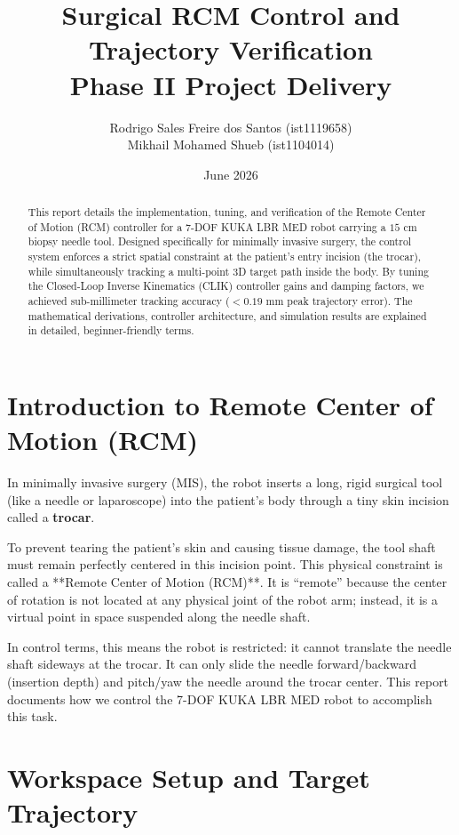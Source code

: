\documentclass[11pt,a4paper]{article}
\title{Surgical RCM Control and Trajectory Verification\\Phase II Project Delivery}
\author{Rodrigo Sales Freire dos Santos (ist1119658) \\ Mikhail Mohamed Shueb (ist1104014)}
\date{June 2026}
\begin{document}
\maketitle

\begin{abstract}
This report details the implementation, tuning, and verification of the Remote Center of Motion (RCM) controller for a 7-DOF KUKA LBR MED robot carrying a $15\text{ cm}$ biopsy needle tool. Designed specifically for minimally invasive surgery, the control system enforces a strict spatial constraint at the patient's entry incision (the trocar), while simultaneously tracking a multi-point 3D target path inside the body. By tuning the Closed-Loop Inverse Kinematics (CLIK) controller gains and damping factors, we achieved sub-millimeter tracking accuracy ($<0.19\text{ mm}$ peak trajectory error). The mathematical derivations, controller architecture, and simulation results are explained in detailed, beginner-friendly terms.
\end{abstract}

\section{Introduction to Remote Center of Motion (RCM)}
In minimally invasive surgery (MIS), the robot inserts a long, rigid surgical tool (like a needle or laparoscope) into the patient's body through a tiny skin incision called a \textbf{trocar}. 

To prevent tearing the patient's skin and causing tissue damage, the tool shaft must remain perfectly centered in this incision point. This physical constraint is called a **Remote Center of Motion (RCM)**. It is ``remote'' because the center of rotation is not located at any physical joint of the robot arm; instead, it is a virtual point in space suspended along the needle shaft.

In control terms, this means the robot is restricted: it cannot translate the needle shaft sideways at the trocar. It can only slide the needle forward/backward (insertion depth) and pitch/yaw the needle around the trocar center. This report documents how we control the 7-DOF KUKA LBR MED robot to accomplish this task.

\section{Workspace Setup and Target Trajectory}
\end{document}
